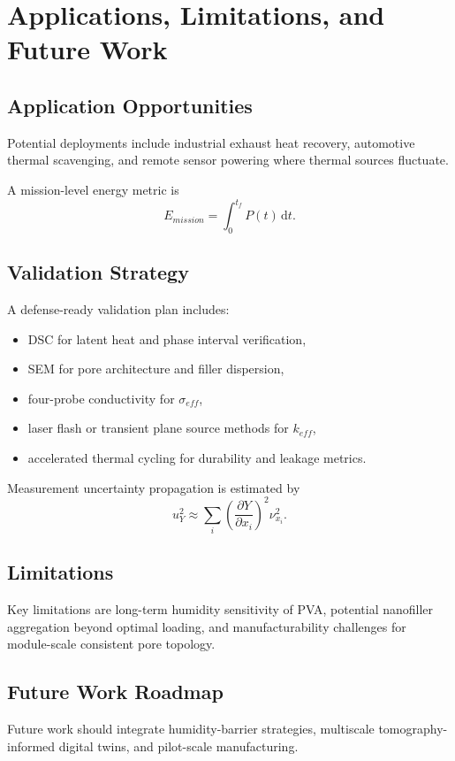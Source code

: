 \chapter{Applications, Limitations, and Future Work}\label{ch:future}

\section{Application Opportunities}
Potential deployments include industrial exhaust heat recovery, automotive thermal scavenging, and remote sensor powering where thermal sources fluctuate.

A mission-level energy metric is
\begin{equation}\label{eq:mission_energy}
E_{mission}=\int_{0}^{t_f} P(t)\,\mathrm{d}t.
\end{equation}

\section{Validation Strategy}
A defense-ready validation plan includes:
\begin{itemize}
    \item DSC for latent heat and phase interval verification,
    \item SEM for pore architecture and filler dispersion,
    \item four-probe conductivity for $\sigma_{eff}$,
    \item laser flash or transient plane source methods for $k_{eff}$,
    \item accelerated thermal cycling for durability and leakage metrics.
\end{itemize}

Measurement uncertainty propagation is estimated by
\begin{equation}\label{eq:uncertainty}
u_Y^2\approx\sum_i\left(\frac{\partial Y}{\partial x_i}\right)^2\nu_{x_i}^2.
\end{equation}

\section{Limitations}
Key limitations are long-term humidity sensitivity of PVA, potential nanofiller aggregation beyond optimal loading, and manufacturability challenges for module-scale consistent pore topology.

\section{Future Work Roadmap}
Future work should integrate humidity-barrier strategies, multiscale tomography-informed digital twins, and pilot-scale manufacturing.

